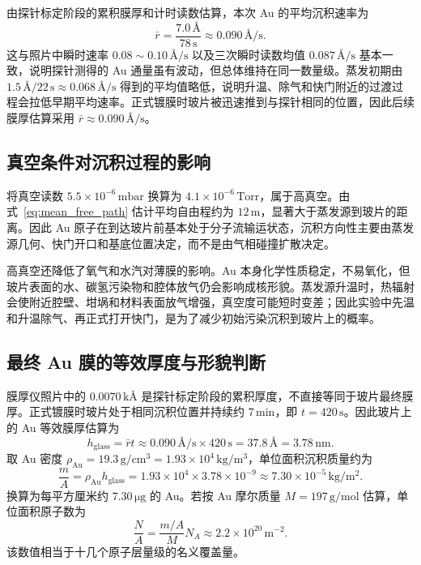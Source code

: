 \documentclass[11pt]{article}
\newcommand{\Ang}{\text{\AA}}
\begin{document}
由探针标定阶段的累积膜厚和计时读数估算，本次 Au 的平均沉积速率为
\begin{equation}
    \bar r=\frac{7.0\,\Ang}{78\,\mathrm{s}}
    \approx 0.090\,\Ang/\mathrm{s}.
\end{equation}
这与照片中瞬时速率 $0.08\sim0.10\,\Ang/\mathrm{s}$ 以及三次瞬时读数均值 $0.087\,\Ang/\mathrm{s}$ 基本一致，说明探针测得的 Au 通量虽有波动，但总体维持在同一数量级。蒸发初期由 $1.5\,\Ang/22\,\mathrm{s}\approx0.068\,\Ang/\mathrm{s}$ 得到的平均值略低，说明升温、除气和快门附近的过渡过程会拉低早期平均速率。正式镀膜时玻片被迅速推到与探针相同的位置，因此后续膜厚估算采用 $\bar r\approx0.090\,\Ang/\mathrm{s}$。

\subsection{真空条件对沉积过程的影响}

将真空读数 $5.5\times10^{-6}\,\mathrm{mbar}$ 换算为 $4.1\times10^{-6}\,\mathrm{Torr}$，属于高真空。由式~\eqref{eq:mean_free_path} 估计平均自由程约为 $12\,\mathrm{m}$，显著大于蒸发源到玻片的距离。因此 Au 原子在到达玻片前基本处于分子流输运状态，沉积方向性主要由蒸发源几何、快门开口和基底位置决定，而不是由气相碰撞扩散决定。

高真空还降低了氧气和水汽对薄膜的影响。Au 本身化学性质稳定，不易氧化，但玻片表面的水、碳氢污染物和腔体放气仍会影响成核形貌。蒸发源升温时，热辐射会使附近腔壁、坩埚和材料表面放气增强，真空度可能短时变差；因此实验中先温和升温除气、再正式打开快门，是为了减少初始污染沉积到玻片上的概率。

\subsection{最终 Au 膜的等效厚度与形貌判断}

膜厚仪照片中的 $0.0070\,\mathrm{k}\Ang$ 是探针标定阶段的累积厚度，不直接等同于玻片最终膜厚。正式镀膜时玻片处于相同沉积位置并持续约 $7\,\mathrm{min}$，即 $t=420\,\mathrm{s}$。因此玻片上的 Au 等效膜厚估算为
\begin{equation}
    h_{\mathrm{glass}}=\bar r t
    \approx 0.090\,\Ang/\mathrm{s}\times420\,\mathrm{s}
    =37.8\,\Ang
    =3.78\,\mathrm{nm}.
\end{equation}
取 Au 密度 $\rho_{\mathrm{Au}}=19.3\,\mathrm{g/cm^3}=1.93\times10^4\,\mathrm{kg/m^3}$，单位面积沉积质量约为
\begin{equation}
    \frac{m}{A}=\rho_{\mathrm{Au}}h_{\mathrm{glass}}
    =1.93\times10^4\times3.78\times10^{-9}
    \approx 7.30\times10^{-5}\,\mathrm{kg/m^2}.
\end{equation}
换算为每平方厘米约 $7.30\,\mathrm{\mu g}$ 的 Au。若按 Au 摩尔质量 $M=197\,\mathrm{g/mol}$ 估算，单位面积原子数为
\begin{equation}
    \frac{N}{A}
    =\frac{m/A}{M}N_A
    \approx 2.2\times10^{20}\,\mathrm{m^{-2}}.
\end{equation}
该数值相当于十几个原子层量级的名义覆盖量。
\end{document}
